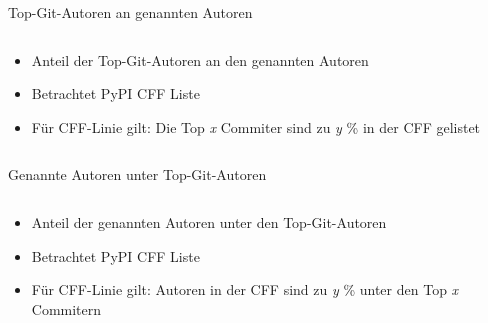 \documentclass[%
    handout,
    aspectratio=1610,
    10pt,
    onlytextwidth, %
]{beamer}
\begin{document}
\begin{frame}{Top-Git-Autoren an genannten Autoren}
    \begin{columns}
        \begin{column}[t]{0.29\textwidth}
            \begin{itemize}
                \item Anteil der Top-Git-Autoren an den genannten Autoren
                \item Betrachtet PyPI CFF Liste
                \item Für CFF-Linie gilt: Die Top \emph{x} Commiter sind zu \emph{y} \% in der CFF gelistet
            \end{itemize}
        \end{column}
        \begin{column}[t]{0.69\textwidth}
            \begin{center}
                
            \end{center}
        \end{column}
    \end{columns}
\end{frame}

\begin{frame}{Genannte Autoren unter Top-Git-Autoren}
    \begin{columns}
        \begin{column}[t]{0.29\textwidth}
            \begin{itemize}
                \item Anteil der genannten Autoren unter den Top-Git-Autoren
                \item Betrachtet PyPI CFF Liste
                \item Für CFF-Linie gilt: Autoren in der CFF sind zu \emph{y} \% unter den Top \emph{x} Commitern
            \end{itemize}
        \end{column}
        \begin{column}[t]{0.69\textwidth}
            \begin{center}
                
            \end{center}
        \end{column}
    \end{columns}
\end{frame}
\end{document}
